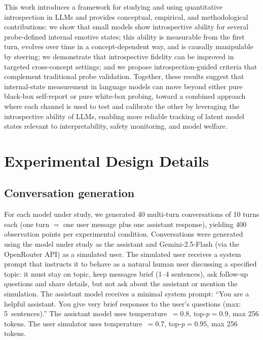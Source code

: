 \documentclass[10pt]{article}
\begin{document}
This work introduces a framework for studying and using quantitative introspection in LLMs and provides conceptual, empirical, and methodological contributions: we show that small models show introspective ability for several probe-defined internal emotive states; this ability is measurable from the first turn, evolves over time in a concept-dependent way, and is causally manipulable by steering; we demonstrate that introspective fidelity can be improved in targeted cross-concept settings; and we propose introspection-guided criteria that complement traditional probe validation. Together, these results suggest that internal-state measurement in language models can move beyond either pure black-box self-report or pure white-box probing, toward a combined approach where each channel is used to test and calibrate the other by leveraging the introspective ability of LLMs, enabling more reliable tracking of latent model states relevant to interpretability, safety monitoring, and model welfare.




\appendix
\section{Experimental Design Details}
\label{app:experimental}

\subsection{Conversation generation}

For each model under study, we generated 40 multi-turn conversations of 10 turns each (one turn $=$ one user message plus one assistant response), yielding 400 observation points per experimental condition.
Conversations were generated using the model under study as the assistant and Gemini-2.5-Flash (via the OpenRouter API) as a simulated user.
The simulated user receives a system prompt that instructs it to behave as a natural human user discussing a specified topic: it must stay on topic, keep messages brief (1--4 sentences), ask follow-up questions and share details, but not ask about the assistant or mention the simulation.
The assistant model receives a minimal system prompt: ``You are a helpful assistant. You give very brief responses to the user's questions (max: 5~sentences).''
The assistant model uses temperature~$= 0.8$, top-$p = 0.9$, max 256 tokens.
The user simulator uses temperature~$= 0.7$, top-$p = 0.95$, max 256 tokens.
\end{document}
